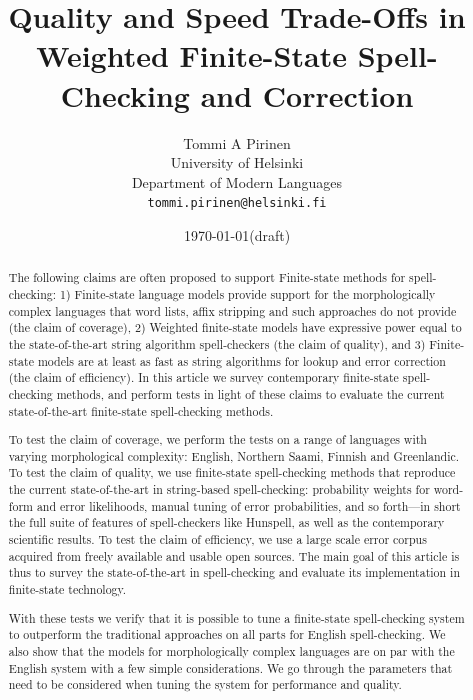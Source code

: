 \documentclass[a4paper,12pt]{article}
\title{Quality and Speed Trade-Offs in
    Weighted Finite-State Spell-Checking and Correction}
\author{Tommi A Pirinen\\
 [0.5cm] University of Helsinki\\ %
 Department of Modern Languages\\ %
 \texttt{tommi.pirinen@helsinki.fi}}   %
\date{\today (draft)}
\begin{document}
\maketitle
\thispagestyle{empty}

\begin{abstract} \noindent The following claims are often proposed to support
    Finite-state methods for spell-checking: 1) Finite-state language models
    provide support for the morphologically complex languages that word lists,
    affix stripping and such approaches do not provide (the claim of coverage),
    2) Weighted finite-state models have expressive power equal to the
    state-of-the-art string algorithm spell-checkers (the claim of quality),
    and 3) Finite-state models are at least as fast as string algorithms for
    lookup and error correction (the claim of efficiency).  In this article we
    survey contemporary finite-state spell-checking methods, and perform tests
    in light of these claims to evaluate the current state-of-the-art
    finite-state spell-checking methods.

    To test the claim of coverage, we perform the tests on a range of languages
    with varying morphological complexity: English, Northern Saami, Finnish and
    Greenlandic.  To test the claim of quality, we use finite-state
    spell-checking methods that reproduce the current state-of-the-art in
    string-based spell-checking: probability weights for word-form and error
    likelihoods, manual tuning of error probabilities, and so forth---in short
    the full suite of features of spell-checkers like Hunspell, as well as the
    contemporary scientific results. To test the claim of efficiency, we use a
    large scale error corpus acquired from freely available and usable open
    sources. The main goal of this article is thus to survey the
    state-of-the-art in spell-checking and evaluate its implementation in
    finite-state technology.  

    With these tests we verify that it is possible to tune a finite-state
    spell-checking system to outperform the traditional approaches on all parts
    for English spell-checking. We also show that the models for
    morphologically complex languages are on par with the English system with a
    few simple considerations. We go through the parameters that need to
    be considered when tuning the system for performance and quality.

\end{abstract}
\end{document}
